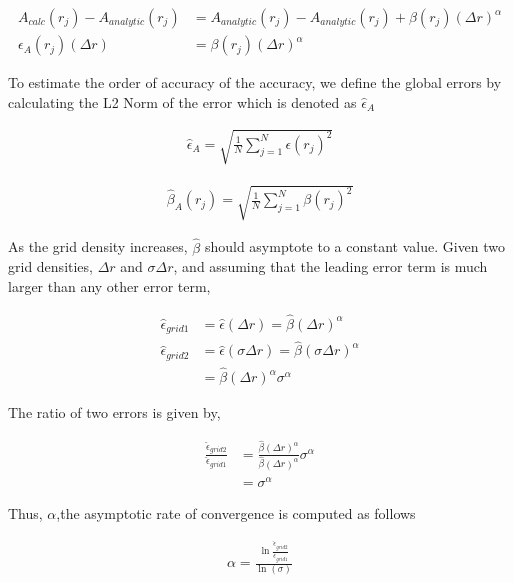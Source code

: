 \documentclass[a4paper]{report}
\begin{document}
\begin{align*}
    A_{calc}(r_j) - A_{analytic}(r_j) &= A_{analytic}(r_j) - A_{analytic}(r_j)
    + \beta(r_j) (\Delta r)^{\alpha} \\
    \epsilon_A(r_j)(\Delta r) &= \beta(r_j) (\Delta r)^{\alpha}
\end{align*}

To estimate the order of accuracy of the accuracy, we define the global errors 
by calculating the L2 Norm of the error which is denoted as $\hat{\epsilon}_A$ 

\begin{align*}
    \hat{\epsilon}_A = \sqrt{\frac{1}{N}\sum_{j=1}^{N} \epsilon(r_j)^2  }
\end{align*}

\begin{align*}
    \hat{\beta}_A(r_j) = \sqrt{\frac{1}{N}\sum_{j=1}^{N} \beta(r_j)^2  }
\end{align*}

As the grid density increases, $\hat{\beta}$ should asymptote to a constant 
value. Given two grid densities, $\Delta r$ and $\sigma\Delta r$, and assuming
that the leading error term is much larger than any other error term,

\begin{align*}
    \hat{\epsilon}_{grid 1} &= \hat{\epsilon}(\Delta r) = \hat{\beta}(\Delta r)^{\alpha} \\
    \hat{\epsilon}_{grid 2} &= \hat{\epsilon}(\sigma \Delta r) = \hat{\beta}(\sigma \Delta r)^{\alpha} \\
                            &= \hat{\beta}(\Delta r)^{\alpha} \sigma^{\alpha}
\end{align*}

The ratio of two errors is given by,

\begin{align*}
    \frac{\hat{\epsilon}_{grid 2}}{\hat{\epsilon}_{grid 1}} &= 
    \frac{\hat{\beta}(\Delta r )^{\alpha}}{\hat{\beta}(\Delta r )^{\alpha}} \sigma^{\alpha} \\ &= \sigma^{\alpha}
\end{align*}

Thus, $\alpha$,the asymptotic rate of convergence is computed as follows 

\begin{align*}
    \alpha = \frac{
        \ln \frac{
            \hat{\epsilon}_{grid 2}
    }{\hat{\epsilon}_{grid 1} }}
    {\ln\left( \sigma \right) }
\end{align*}
\end{document}
